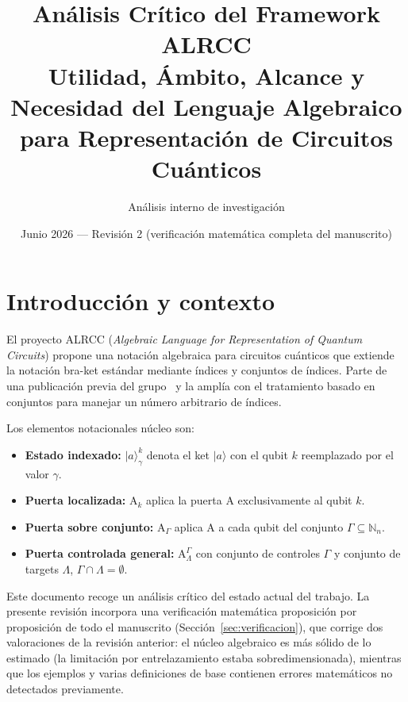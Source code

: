 \documentclass[12pt, a4paper]{article}
\title{%
  \textbf{Análisis Crítico del Framework ALRCC}\\
  \large Utilidad, Ámbito, Alcance y Necesidad del Lenguaje Algebraico\\
  para Representación de Circuitos Cuánticos
}
\author{Análisis interno de investigación}
\date{Junio 2026 --- Revisión 2 (verificación matemática completa del manuscrito)}
\newcommand{\gate}[1]{\text{#1}}
\newcommand{\stateket}[3]{\ket{#1}^{#2}_{#3}}
\newcommand{\stategate}[3]{\gate{#1}^{#2}_{#3}}
\newcommand{\ket}[1]{|#1\rangle}
\begin{document}
\maketitle
\tableofcontents
\newpage

\section{Introducción y contexto}

El proyecto ALRCC (\textit{Algebraic Language for Representation of Quantum Circuits})
propone una notación algebraica para circuitos cuánticos que extiende la notación
bra-ket estándar mediante índices y conjuntos de índices.
Parte de una publicación previa del grupo~\cite{reina2024ix} y la amplía con el
tratamiento basado en conjuntos para manejar un número arbitrario de índices.

Los elementos notacionales núcleo son:

\begin{itemize}
  \item \textbf{Estado indexado:} $\stateket{a}{k}{\gamma}$ denota el ket
        $\ket{a}$ con el qubit $k$ reemplazado por el valor $\gamma$.
  \item \textbf{Puerta localizada:} $\gate{A}_k$ aplica la puerta $\gate{A}$
        exclusivamente al qubit $k$.
  \item \textbf{Puerta sobre conjunto:} $\gate{A}_\Gamma$ aplica $\gate{A}$
        a cada qubit del conjunto $\Gamma \subseteq \mathbb{N}_n$.
  \item \textbf{Puerta controlada general:} $\stategate{A}{\Gamma}{\Lambda}$
        con conjunto de controles $\Gamma$ y conjunto de targets $\Lambda$,
        $\Gamma \cap \Lambda = \emptyset$.
\end{itemize}

Este documento recoge un análisis crítico del estado actual del trabajo.
La presente revisión incorpora una verificación matemática proposición por
proposición de todo el manuscrito (Sección~\ref{sec:verificacion}), que
corrige dos valoraciones de la revisión anterior: el núcleo algebraico es
más sólido de lo estimado (la limitación por entrelazamiento estaba
sobredimensionada), mientras que los ejemplos y varias definiciones de base
contienen errores matemáticos no detectados previamente.

\end{document}
